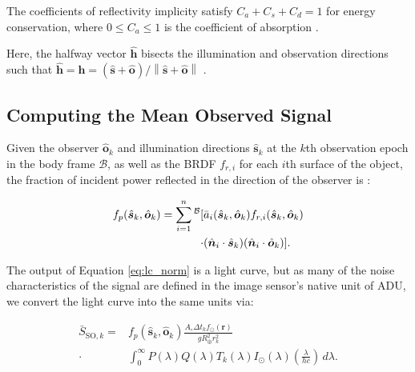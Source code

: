 \documentclass[a4paper,twocolumn]{spaceDebrisC} %
\newcommand{\vctr}[1]{\bm{#1}}
\newcommand{\unitv}[1]{\hat{\vctr{#1}}}
\newcommand{\preup}[1]{\prescript{#1}{}{}}
\newcommand{\rf}[1]{\mathcal{\MakeUppercase{#1}}}
\newcommand{\prf}[1]{\preup{\rf{#1}}}
\newcommand{\norm}[1]{\left\lVert#1\right\rVert}
\begin{document}
The coefficients of reflectivity implicity satisfy $C_a + C_s + C_d = 1$ for energy conservation, where $ 0 \leq C_a \leq 1$ is the coefficient of absorption \cite{fan2020thesis}.

Here, the halfway vector $\unitv{h}$ bisects the illumination and observation directions such that $\unitv{h} = \unitv{h} = (\unitv{s} + \unitv{o})/\norm{\unitv{s} + \unitv{o}}$ \cite{duvenhage2013}.

\subsection{Computing the Mean Observed Signal}

Given the observer $\unitv{o}_k$ and illumination directions $\unitv{s}_k$ at the $k$th observation epoch in the body frame $\mathcal{B}$, as well as the BRDF $f_{r,i}$ for each $i$th surface of the object, the fraction of incident power reflected in the direction of the observer is \cite{fan2020thesis}:

\begin{equation} \label{eq:lc_norm}
  \begin{split} 
 f_p(\unitv{s}_k, \unitv{o}_k) = \sum_{i=1}^n\prf{B}[&\bar{a}_i(\unitv{s}_k, \unitv{o}_k) f_{r,i}(\unitv{s}_k, \unitv{o}_k) \\ \cdot &(\unitv{n}_i \cdot \unitv{s}_k) (\unitv{n}_i \cdot \unitv{o}_k)]. 
  \end{split} 
\end{equation}

The output of Equation \ref{eq:lc_norm} is a light curve, but as many of the noise characteristics of the signal are defined in the image sensor's native unit of ADU, we convert the light curve into the same units via:

\begin{equation} \label{eq:general_bright}
  \begin{split} 
 \bar{S}_{\text{SO},k} = &f_p(\unitv{s}_k, \unitv{o}_k) \frac{A_\circ \Delta t_k f_\odot(\vctr{r})}{g R_\oplus^2 r_k^2} \\ \cdot &\int_{0}^{\infty}{P(\lambda)Q(\lambda)T_k(\lambda) I_\odot(\lambda) \left(\frac{\lambda}{hc}\right)}\,d\lambda. 
  \end{split}
\end{equation}
\end{document}
